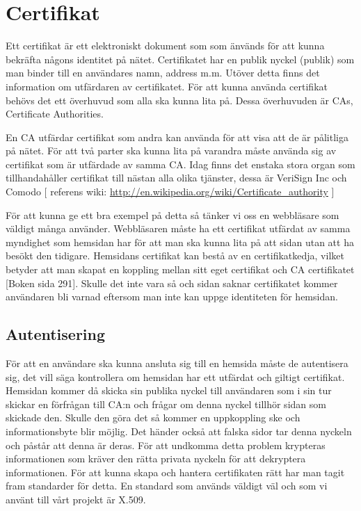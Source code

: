 \section{Certifikat}
Ett certifikat är ett elektroniskt dokument som som änvänds för att kunna bekräfta någons identitet på nätet. Certifikatet har en publik nyckel (publik) som man binder till en användares namn, address m.m. 
Utöver detta finns det information om utfärdaren av certifikatet. 
För att kunna använda certifikat behövs det ett överhuvud som alla ska kunna lita på. 
Dessa överhuvuden är CAs, Certificate Authorities. 

En CA utfärdar certifikat som andra kan använda för att visa att de är pålitliga på nätet. För att två parter ska kunna lita på varandra måste använda sig av certifikat som är utfärdade av samma CA. Idag finns det enstaka stora organ som tillhandahåller certifikat till nästan alla olika tjänster, dessa är VeriSign Inc och Comodo  [ referens wiki: \url{http://en.wikipedia.org/wiki/Certificate_authority} ]

För att kunna ge ett bra exempel på detta så tänker vi oss en webbläsare som väldigt många använder. Webbläsaren måste ha ett certifikat utfärdat av samma myndighet som hemsidan har för att man ska kunna lita på att sidan utan att ha besökt den tidigare. Hemsidans certifikat kan bestå av en certifikatkedja, vilket betyder att man skapat en koppling mellan sitt eget certifikat och CA certifikatet [Boken sida 291]. Skulle det inte vara så och sidan saknar certifikatet kommer användaren bli varnad eftersom man inte kan uppge identiteten för hemsidan.

\subsection{Autentisering}
För att en användare ska kunna ansluta sig till en hemsida måste de autentisera sig, det vill säga kontrollera om hemsidan har ett utfärdat och giltigt certifikat. Hemsidan kommer då skicka sin publika nyckel till användaren som i sin tur skickar en förfrågan till CA:n och frågar om denna nyckel tillhör sidan som skickade den. Skulle den göra det så kommer en uppkoppling ske och informationsbyte blir möjlig.
Det händer också att falska sidor tar denna nyckeln och påstår att denna är deras. För att undkomma detta problem krypteras informationen som kräver den rätta privata nyckeln för att dekryptera informationen.
För att kunna skapa och hantera certifikaten rätt har man tagit fram standarder för detta. En standard som används väldigt väl och som vi använt till vårt projekt är X.509.                                         

